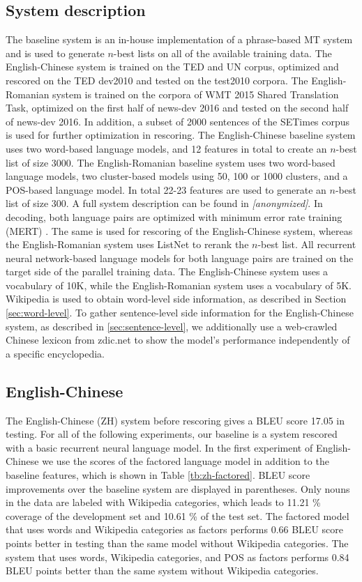 \documentclass[a4paper]{article}
\newcommand{\anony}[1]{\textit{[anonymized]}}
\begin{document}
\subsection{System description}
The baseline system is an in-house implementation of a phrase-based MT system and is used to generate $n$-best lists on all of the available training data. The English-Chinese system is trained on the TED and UN corpus, optimized and rescored on the TED dev2010 and tested on the test2010 corpora.
The English-Romanian system is trained on the corpora of WMT 2015 Shared Translation Task, optimized on the first half of news-dev 2016 and tested on the second half of news-dev 2016. In addition, a subset of 2000 sentences of the SETimes corpus is used for further optimization in rescoring.
The English-Chinese baseline system uses two word-based language models, and 12 features in total to create an $n$-best list of size 3000.
The English-Romanian baseline system uses two word-based language models, two cluster-based models using 50, 100 or 1000 clusters, and a POS-based language model. In total 22-23 features are used to generate an $n$-best list of size 300. A full system description can be found in \anony{\cite{niehuesusing}}.
In decoding, both language pairs are optimized with minimum error rate training (MERT) \cite{och2003minimum}. The same is used for rescoring of the English-Chinese system, whereas the English-Romanian system uses ListNet to rerank the $n$-best list.
All recurrent neural network-based language models for both language pairs are trained on the target side of the parallel training data. The English-Chinese system uses a vocabulary of 10K, while the English-Romanian system uses a vocabulary of 5K. Wikipedia is used to obtain word-level side information, as described in Section \ref{sec:word-level}.
To gather sentence-level side information for the English-Chinese system, as described in \ref{sec:sentence-level}, we additionally use a web-crawled Chinese lexicon from zdic.net \cite{zdic} to show the model's performance independently of a specific encyclopedia.


\subsection{English-Chinese}
The English-Chinese (ZH) system before rescoring gives a BLEU score 17.05 in testing. For all of the following experiments, our baseline is a system rescored with a basic recurrent neural language model.
In the first experiment of English-Chinese we use the scores of the factored language model in addition to the baseline features, which is shown in Table \ref{tb:zh-factored}. BLEU score improvements over the baseline system are displayed in parentheses. Only nouns in the data are labeled with Wikipedia categories, which leads to 11.21 \% coverage of the development set and 10.61 \% of the test set. The factored model that uses words and Wikipedia categories as factors performs 0.66 BLEU score points better in testing than the same model without Wikipedia categories. The system that uses words, Wikipedia categories, and POS as factors performs 0.84 BLEU points better than the same system without Wikipedia categories.
\end{document}
